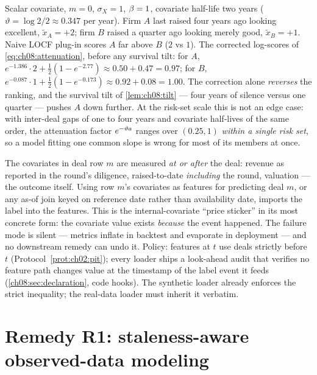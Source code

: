 \begin{example}\label{ex:ch08:inversion}
Scalar covariate, $m = 0$, $\sigma_X = 1$, $\beta = 1$, covariate
half-life two years ($\vartheta = \log 2 / 2 \approx 0.347$ per year).
Firm $A$ last raised four years ago looking excellent, $\tilde x_A =
+2$; firm $B$ raised a quarter ago looking merely good, $\tilde x_B =
+1$. Naive LOCF plug-in scores $A$ far above $B$ ($2$ vs $1$). The
corrected log-scores of \cref{eq:ch08:attenuation}, before any survival
tilt: for $A$, $e^{-1.386}\cdot 2 + \tfrac12(1 - e^{-2.77}) \approx 0.50
+ 0.47 = 0.97$; for $B$, $e^{-0.087}\cdot 1 + \tfrac12(1 - e^{-0.173})
\approx 0.92 + 0.08 = 1.00$. The correction alone \emph{reverses} the
ranking, and the survival tilt of \cref{lem:ch08:tilt} --- four years of
silence versus one quarter --- pushes $A$ down further. At the risk-set
scale this is not an edge case: with inter-deal gaps of one to four
years and covariate half-lives of the same order, the attenuation factor
$e^{-\vartheta a}$ ranges over $(0.25, 1)$ \emph{within a single
risk set}, so a model fitting one common slope is wrong for most of its
members at once.
\end{example}

\begin{warning}
\label{warn:ch08:lookahead}
The covariates in deal row $m$ are measured \emph{at or after} the deal:
revenue as reported in the round's diligence, raised-to-date
\emph{including} the round, valuation --- the outcome itself. Using row
$m$'s covariates as features for predicting deal $m$, or any as-of join
keyed on reference date rather than availability date, imports the label
into the features. This is the internal-covariate ``price sticker'' in
its most concrete form: the covariate value exists \emph{because} the
event happened. The failure mode is silent --- metrics inflate in
backtest and evaporate in deployment --- and no downstream remedy can
undo it. Policy: features at $t$ use deals strictly before $t$
(Protocol~\ref{prot:ch02:pit}); every loader ships a look-ahead audit that
verifies no feature path changes value at the timestamp of the label
event it feeds (\cref{ch08:sec:declaration}, code hooks). The synthetic
loader already enforces the strict inequality; the real-data loader must
inherit it verbatim.
\end{warning}

\section{Remedy R1: staleness-aware observed-data modeling}
\label{ch08:sec:r1}

